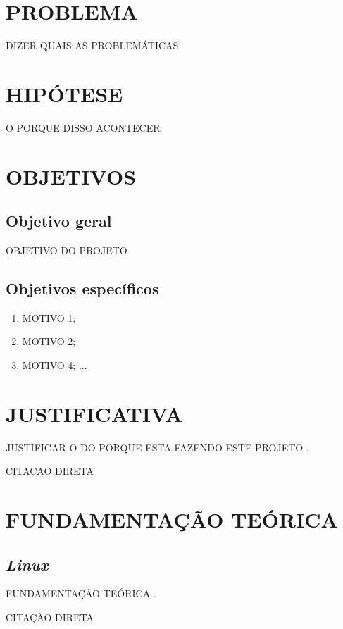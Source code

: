 \documentclass{unemat-tex}
\begin{document}
\chapter{PROBLEMA}
DIZER QUAIS AS PROBLEMÁTICAS
	
\chapter{HIPÓTESE}
O PORQUE DISSO ACONTECER
	
\chapter{OBJETIVOS}
	\section{Objetivo geral}
	OBJETIVO DO PROJETO
	
	\section{Objetivos específicos}
		\begin{enumerate}
			\item MOTIVO 1;
			\item MOTIVO 2;
			\item MOTIVO 4; ...
			\end{enumerate}

\chapter{JUSTIFICATIVA}
JUSTIFICAR O DO PORQUE ESTA FAZENDO ESTE PROJETO \cite{mota2012descobrindo}.

		\begin{citacao}
			CITACAO DIRETA
		\end{citacao}


\chapter{FUNDAMENTAÇÃO TEÓRICA}
	\section{\textit{Linux}}
	
	FUNDAMENTAÇÃO TEÓRICA \cite{nomenacitacao}.
	
	
	
		\begin{citacao}
		CITAÇÃO DIRETA
		\end{citacao}
	
\end{document}
